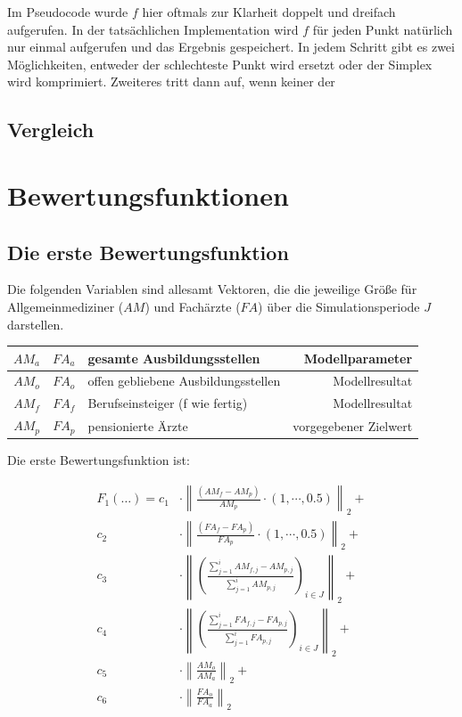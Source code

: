 \documentclass[a4paper,12pt]{article}
\begin{document}
Im Pseudocode wurde $f$ hier oftmals zur Klarheit doppelt und dreifach aufgerufen. In der tatsächlichen Implementation wird $f$ für jeden Punkt natürlich nur einmal aufgerufen und das Ergebnis gespeichert. In jedem Schritt gibt es zwei Möglichkeiten, entweder der schlechteste Punkt wird ersetzt oder der Simplex wird komprimiert. Zweiteres tritt dann auf, wenn keiner der 


\subsection{Vergleich}

\newpage

\section{Bewertungsfunktionen}

\subsection{Die erste Bewertungsfunktion}

Die folgenden Variablen sind allesamt Vektoren, die die jeweilige Größe für Allgemeinmediziner ($AM$) und Fachärzte ($FA$) über die Simulationsperiode $J$ darstellen.

\begin{center}
\begin{tabular}{ | c | c | l | r |}
\hline
$AM_a$ & $FA_a$ & gesamte Ausbildungsstellen & Modellparameter \\ \hline
$AM_o$ & $FA_o$ & offen gebliebene Ausbildungsstellen & Modellresultat \\ \hline
$AM_f$ & $FA_f$ & Berufseinsteiger (f wie fertig) & Modellresultat \\ \hline
$AM_p$ & $FA_p$ & pensionierte Ärzte & vorgegebener Zielwert \\ \hline
\end{tabular}
\end{center}

Die erste Bewertungsfunktion ist:

\begin{align*}
F_1(\hdots) = 	c_1 &\cdot \left\| \frac{(AM_f - AM_p)}{AM_p} \cdot (1, \cdots, 0.5)  \right\|_2 + \\
			c_2 &\cdot \left\| \frac{(FA_f - FA_p)}{FA_p} \cdot (1, \cdots, 0.5)  \right\|_2  +\\
			c_3 &\cdot \left\| \left( \frac{ \sum\nolimits_{j=1}^i AM_{f,j} - AM_{p,j} }{\sum\nolimits_{j=1}^i AM_{p,j} } \right)_{i\in J} \right\|_2 +\\
			c_4 &\cdot \left\| \left( \frac{ \sum\nolimits_{j=1}^i FA_{f,j} - FA_{p,j} }{\sum\nolimits_{j=1}^i FA_{p,j} } \right)_{i\in J} \right\|_2 +\\
			c_5 &\cdot \left\| \frac{AM_o}{AM_a} \right\|_2 +\\
			c_6 &\cdot \left\| \frac{FA_o}{FA_a} \right\|_2 
\end{align*}
\end{document}
